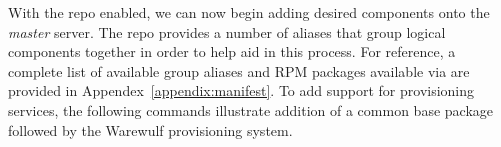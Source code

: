 With the \FSP{} repo enabled, we can now begin adding desired components onto the
{\em master} server. The \FSP{} repo provides a number of aliases that group
logical components together in order to help aid in this process. For
reference, a complete list of available group aliases and RPM packages available
via \FSP{} are provided in Appendex~\ref{appendix:manifest}.  To add
support for provisioning services, the following commands illustrate addition
of a common base package followed by the Warewulf provisioning system.
